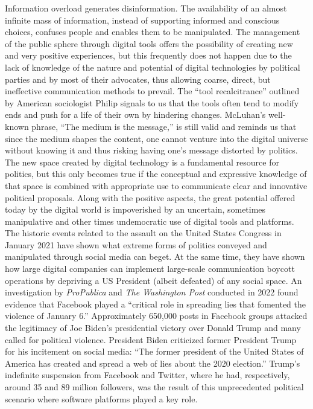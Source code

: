 Information overload generates disinformation. The availability of an almost infinite mass of information, instead of supporting informed and conscious choices, confuses people and enables them to be manipulated. The management of the public sphere through digital tools offers the possibility of creating new and very positive experiences, but this frequently does not happen due to the lack of knowledge of the nature and potential of digital technologies by political parties and by most of their advocates, thus allowing coarse, direct, but ineffective communication methods to prevail. The ``tool recalcitrance'' outlined by American sociologist Philip \citet{chap:8:Selznick:1957} signals to us that the tools often tend to modify ends and push for a life of their own by hindering changes. McLuhan's well-known phrase, ``The medium is the message,'' is still valid and reminds us that since the medium shapes the content, one cannot venture into the digital universe without knowing it and thus risking having one's message distorted by politics. The new space created by digital technology is a fundamental resource for politics, but this only becomes true if the conceptual and expressive knowledge of that space is combined with appropriate use to communicate clear and innovative political proposals. Along with the positive aspects, the great potential offered today by the digital world is impoverished by an uncertain, sometimes manipulative and other times undemocratic use of digital tools and platforms. The historic events related to the assault on the United States Congress in January 2021 have shown what extreme forms of politics conveyed and manipulated through social media can beget. At the same time, they have shown how large digital companies can implement large-scale communication boycott operations by depriving a US President (albeit defeated) of any social space. An investigation by \textit{ProPublica} and \textit{The Washington Post} conducted in 2022 found evidence that Facebook played a ``critical role in spreading lies that fomented the violence of January 6.'' Approximately 650,000 posts in Facebook groups attacked the legitimacy of Joe Biden's presidential victory over Donald Trump and many called for political violence. President Biden criticized former President Trump for his incitement on social media: ``The former president of the United States of America has created and spread a web of lies about the 2020 election.'' Trump's indefinite suspension from Facebook and Twitter, where he had, respectively, around 35 and 89 million followers, was the result of this unprecedented political scenario where software platforms played a key role.

